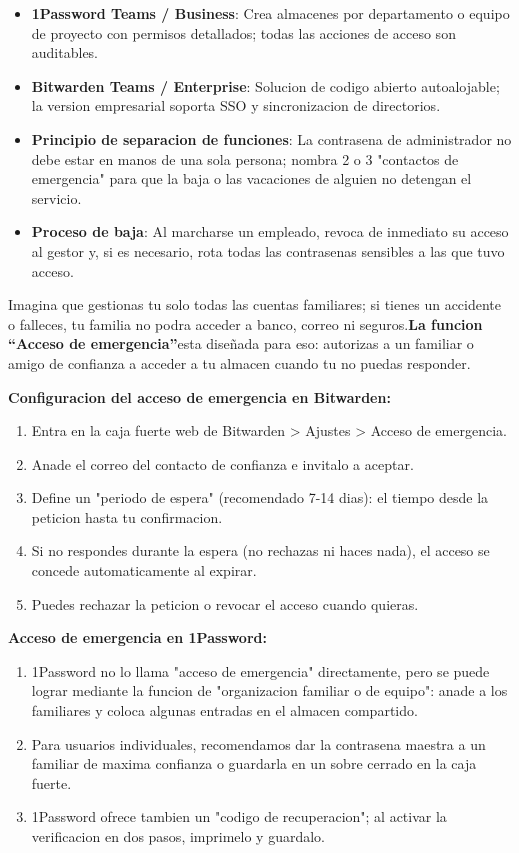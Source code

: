 \begin{itemize}
  \item \textbf{1Password Teams / Business}: Crea almacenes por departamento o equipo de proyecto con permisos detallados; todas las acciones de acceso son auditables.
  \item \textbf{Bitwarden Teams / Enterprise}: Solucion de codigo abierto autoalojable; la version empresarial soporta SSO y sincronizacion de directorios.
  \item \textbf{Principio de separacion de funciones}: La contrasena de administrador no debe estar en manos de una sola persona; nombra 2 o 3 "contactos de emergencia" para que la baja o las vacaciones de alguien no detengan el servicio.
  \item \textbf{Proceso de baja}: Al marcharse un empleado, revoca de inmediato su acceso al gestor y, si es necesario, rota todas las contrasenas sensibles a las que tuvo acceso.
\end{itemize}


Imagina que gestionas tu solo todas las cuentas familiares; si tienes un accidente o falleces, tu familia no podra acceder a banco, correo ni seguros.\textbf{La funcion “Acceso de emergencia”}esta diseñada para eso: autorizas a un familiar o amigo de confianza a acceder a tu almacen cuando tu no puedas responder.

\textbf{Configuracion del acceso de emergencia en Bitwarden:}

\begin{enumerate}
  \item Entra en la caja fuerte web de Bitwarden > Ajustes > Acceso de emergencia.
  \item Anade el correo del contacto de confianza e invitalo a aceptar.
  \item Define un "periodo de espera" (recomendado 7-14 dias): el tiempo desde la peticion hasta tu confirmacion.
  \item Si no respondes durante la espera (no rechazas ni haces nada), el acceso se concede automaticamente al expirar.
  \item Puedes rechazar la peticion o revocar el acceso cuando quieras.
\end{enumerate}

\textbf{Acceso de emergencia en 1Password:}

\begin{enumerate}
  \item 1Password no lo llama "acceso de emergencia" directamente, pero se puede lograr mediante la funcion de "organizacion familiar o de equipo": anade a los familiares y coloca algunas entradas en el almacen compartido.
  \item Para usuarios individuales, recomendamos dar la contrasena maestra a un familiar de maxima confianza o guardarla en un sobre cerrado en la caja fuerte.
  \item 1Password ofrece tambien un "codigo de recuperacion"; al activar la verificacion en dos pasos, imprimelo y guardalo.
\end{enumerate}

